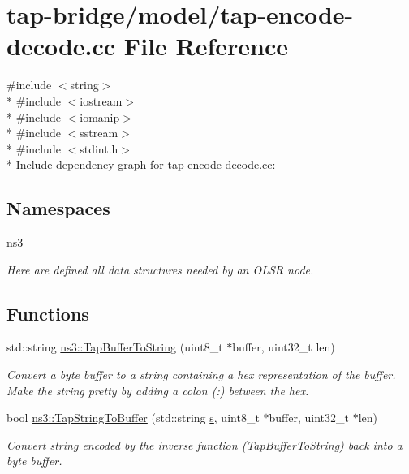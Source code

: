 \hypertarget{tap-encode-decode_8cc}{}\section{tap-\/bridge/model/tap-\/encode-\/decode.cc File Reference}
\label{tap-encode-decode_8cc}
{\ttfamily \#include $<$string$>$}\\*
{\ttfamily \#include $<$iostream$>$}\\*
{\ttfamily \#include $<$iomanip$>$}\\*
{\ttfamily \#include $<$sstream$>$}\\*
{\ttfamily \#include $<$stdint.\+h$>$}\\*
Include dependency graph for tap-\/encode-\/decode.cc\+:
\subsection*{Namespaces}
\begin{DoxyCompactItemize}
\item 
 \hyperlink{namespacens3}{ns3}
\begin{DoxyCompactList}\small\item\em Here are defined all data structures needed by an O\+L\+SR node. \end{DoxyCompactList}\end{DoxyCompactItemize}
\subsection*{Functions}
\begin{DoxyCompactItemize}
\item 
std\+::string \hyperlink{namespacens3_abf9f661689b523b4b37b97879c1ffc12}{ns3\+::\+Tap\+Buffer\+To\+String} (uint8\+\_\+t $\ast$buffer, uint32\+\_\+t len)
\begin{DoxyCompactList}\small\item\em Convert a byte buffer to a string containing a hex representation of the buffer. Make the string pretty by adding a colon (\textquotesingle{}\+:\textquotesingle{}) between the hex. \end{DoxyCompactList}\item 
bool \hyperlink{namespacens3_aac751b6756ef1eb455958b985b357b6d}{ns3\+::\+Tap\+String\+To\+Buffer} (std\+::string \hyperlink{generate__test__data__lte__sinr_8m_ad83eeb3a142285d1243a08c6b7026df8}{s}, uint8\+\_\+t $\ast$buffer, uint32\+\_\+t $\ast$len)
\begin{DoxyCompactList}\small\item\em Convert string encoded by the inverse function (Tap\+Buffer\+To\+String) back into a byte buffer. \end{DoxyCompactList}\end{DoxyCompactItemize}
